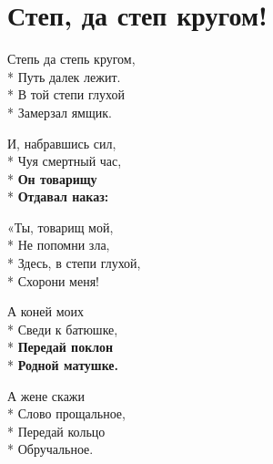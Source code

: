 \vspace{\fill}\newpage

\section{Степ, да степ кругом!}
\label{song:Степ,_да_степ_кругом!}

\medskip

\begin{minipage}{\linewidth}
Степь да степь кругом,\\*
Путь далек лежит.\\*
В той степи глухой\\*
Замерзал ямщик.\\
\end{minipage}\par\medskip\nobreak

\medskip

\begin{minipage}{\linewidth}
И, набравшись сил,\\*
Чуя смертный час,\\*
\textbf{Он товарищу}\\*
\textbf{Отдавал наказ:}\\
\end{minipage}\par\medskip\nobreak

\medskip

\begin{minipage}{\linewidth}
«Ты, товарищ мой,\\*
Не попомни зла,\\*
Здесь, в степи глухой,\\*
Схорони меня!\\
\end{minipage}\par\medskip\nobreak

\medskip

\begin{minipage}{\linewidth}
А коней моих\\*
Сведи к батюшке,\\*
\textbf{Передай поклон}\\*
\textbf{Родной матушке.}\\
\end{minipage}\par\medskip\nobreak

\medskip

\begin{minipage}{\linewidth}
А жене скажи\\*
Слово прощальное,\\*
Передай кольцо\\*
Обручальное.\\
\end{minipage}\par\medskip\nobreak

